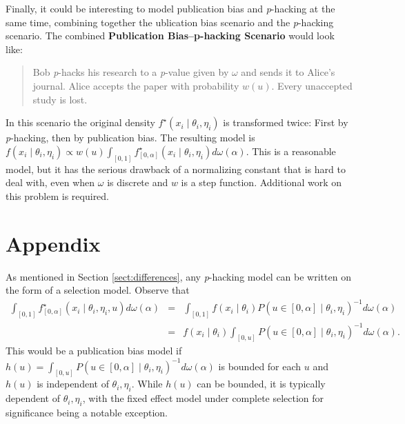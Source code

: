 \documentclass{article}
\theoremstyle{plain}
\theoremstyle{definition}
\begin{document}
Finally, it could be interesting to model publication bias and \textit{p}-hacking at the same time, combining together the ublication bias scenario and the \textit{p}-hacking scenario. The combined \textbf{Publication Bias--p-hacking Scenario} would look like:
\begin{quote}
Bob \textit{p}-hacks his research to a \emph{p}-value given by $\omega$ and sends it to Alice's journal. Alice accepts the paper with probability $w\left(u\right)$. Every unaccepted study is lost.
\end{quote}
In this scenario the original density $f^{\star}\left(x_{i}\mid\theta_{i},\eta_{i}\right)$ is transformed twice: First by \textit{p}-hacking, then by publication bias. The resulting model is $f\left(x_{i}\mid\theta_{i},\eta_{i}\right)\propto w\left(u\right)\int_{[0,1]}f_{[0,\alpha]}^{\star}\left(x_{i}\mid\theta_{i},\eta_{i}\right)d\omega\left(\alpha\right)$. This is a reasonable model, but it has the serious drawback of a normalizing constant that is hard to deal with, even when $\omega$ is discrete and $w$ is a step function. Additional work on this problem is required.

\section*{Appendix}
As mentioned in Section \ref{sect:differences}, any \textit{p}-hacking model can be written on the form of a selection model. Observe that
\begin{eqnarray*}
\int_{[0,1]}f_{\left[0,\alpha\right]}^{\star}\left(x_{i}\mid\theta_{i},\eta_{i}, u\right)d\omega\left(\alpha\right) & = & \int_{[0,1]}f\left(x_{i}\mid\theta_{i}\right)P\left(u\in\left[0,\alpha\right]\mid\theta_{i},\eta_{i}\right)^{-1}d\omega\left(\alpha\right)\\
 & = & f\left(x_{i}\mid\theta_{i}\right)\int_{[0,u]}P\left(u\in\left[0,\alpha\right]\mid\theta_{i},\eta_{i}\right)^{-1}d\omega\left(\alpha\right).
\end{eqnarray*}
This would be a publication bias model if $h\left(u\right)=\int_{[0,u]}P\left(u\in\left[0,\alpha\right]\mid\theta_{i},\eta_{i}\right)^{-1}d\omega\left(\alpha\right)$ is bounded for each $u$ and $h\left(u\right)$ is independent of $\theta_{i},\eta_{i}$. While $h\left(u\right)$ can be bounded, it is typically dependent of $\theta_{i},\eta_{i}$, with the fixed effect model under complete selection for significance being a notable exception.
\end{document}
